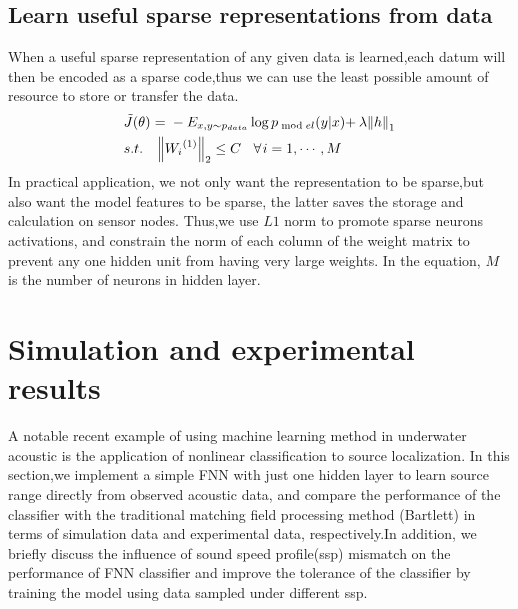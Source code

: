 \subsection{Learn useful sparse representations from data}
When a useful sparse representation of any given data is learned,each datum will then be encoded as a sparse code,thus we can use the least possible amount of resource to store or transfer the data.
\begin{equation}
\begin{split}
&\tilde J(\theta ){\kern 1pt} {\kern 1pt} {\kern 1pt} {\rm{ = }}{\kern 1pt} {\kern 1pt} {\kern 1pt}  - {E_{x,y \sim {p_{data}}}}\log {p_{\bmod el}}(y|x){\rm{ + }}{\kern 1pt} {\kern 1pt} \lambda {\left\| h \right\|_1}\\
& s.t.{\kern 1pt} {\kern 1pt} {\kern 1pt} {\kern 1pt} {\kern 1pt} {\kern 1pt} {\kern 1pt} {\kern 1pt} {\kern 1pt} {\kern 1pt} {\left\| {{W_i}^{(1)}} \right\|_2} \le C{\kern 1pt} {\kern 1pt} {\kern 1pt} {\kern 1pt} {\kern 1pt} {\kern 1pt} {\kern 1pt} {\kern 1pt} {\kern 1pt} \forall {\kern 1pt} i = 1, \cdots ,M\\
\end{split}
\end{equation}
In practical application, we not only want the representation to be sparse,but also want the model features to be sparse, the latter saves the storage and calculation on sensor nodes. Thus,we use $L1$ norm to promote sparse neurons activations, and constrain the norm of each column of the weight matrix to prevent any one hidden unit from having very large weights. In the equation, $M$ is the number of neurons in hidden layer.

\section{Simulation and experimental results}
A notable recent example of using machine learning method in underwater acoustic is the application of nonlinear classification to source localization\cite{niu2017source}.
In this section,we implement a simple FNN with just one hidden layer to learn source range directly from observed acoustic data,
and compare the performance of the classifier with the traditional matching field processing method (Bartlett) in terms of simulation data and experimental data, respectively.In addition, we briefly discuss the influence of sound speed profile(ssp) mismatch on the performance of FNN classifier and improve the tolerance of the classifier by training the model using data sampled under different ssp.

